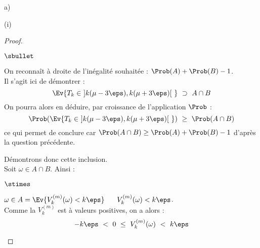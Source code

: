 \documentclass[11pt]{article}%
\begin{document}
\begin{liste}{a)}
\begin{nonoliste}{(i)}
    \begin{proof}~%
      \begin{noliste}{$\sbullet$}
      \item On reconnaît à droite de l'inégalité souhaitée : $\Prob(A)
        + \Prob(B) - 1$.\\
        Il s'agit ici de démontrer : 
        \[
        \Ev{ T_{k} \in \ ]k(\mu - 3 \eps), k(\mu + 3 \eps)[ \ } \
        \supset \ A \cap B
        \]
        On pourra alors en déduire, par croissance de l'application
        $\Prob$ :
        \[
        \Prob(\Ev{ T_{k} \in \ ]k(\mu - 3 \eps), k(\mu + 3 \eps)[ \ })
        \ \geq \ \Prob(A \cap B)
        \]
        ce qui permet de conclure car $\Prob(A \cap B) \geq \Prob(A) +
        \Prob(B) - 1$ d'après la question précédente.

      \item Démontrons donc cette inclusion.\\
        Soit $\omega \in A \cap B$. Ainsi :
        \begin{noliste}{$\stimes$}
        \item $\omega \in A = \Ev{V_{k}^{(m)}(\omega) < k \eps}$ \ \ie
          \ $V_{k}^{(m)}(\omega) < k \eps$.\\
          Comme la \var $V_{k}^{(m)}$ est à valeurs positives, on a
          alors :
          \[
          -k \eps \ < \ 0 \ \leq \ V_{k}^{(m)}(\omega) \ < \ k \eps
          \]


\end{noliste}
\end{noliste}
\end{proof}
\end{nonoliste}
\end{liste}
\end{document}
